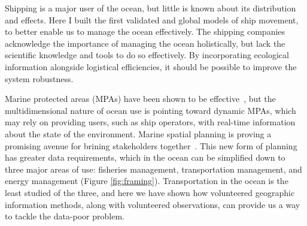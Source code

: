 
Shipping is a major user of the ocean, but little is known about its distribution and effects. Here I built the first validated and global models of ship movement, to better enable us to manage the ocean effectively. The shipping companies acknowledge the importance of managing the ocean holistically, but lack the scientific knowledge and tools to do so effectively. By incorporating ecological information alongside logistical efficiencies, it should be possible to improve the system robustness.

Marine protected areas (MPAs) have been shown to be effective~\citep{halpern2002marine}, but the multidimensional nature of ocean use is pointing toward dynamic MPAs, which may rely on providing users, such as ship operators, with real-time information about the state of the environment. Marine spatial planning is proving a promising avenue for brining stakeholders together~\citep{merrifield2012marinemap}. This new form of planning has greater data requirements, which in the ocean can be simplified down to three major areas of use: fisheries management, transportation management, and energy management (Figure \ref{fig:framing}). Transportation in the ocean is the least studied of the three, and here we have shown how volunteered geographic information methods, along with volunteered observations, can provide us a way to tackle the data-poor problem.










